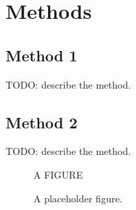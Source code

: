 \chapter{Methods}\label{chap:methods}

\section{Method 1}

TODO: describe the method.

\section{Method 2}

TODO: describe the method.

\begin{figure}[ht]
    \centering
    A FIGURE
    \caption{A placeholder figure.}
    \label{fig:placeholder}
\end{figure}